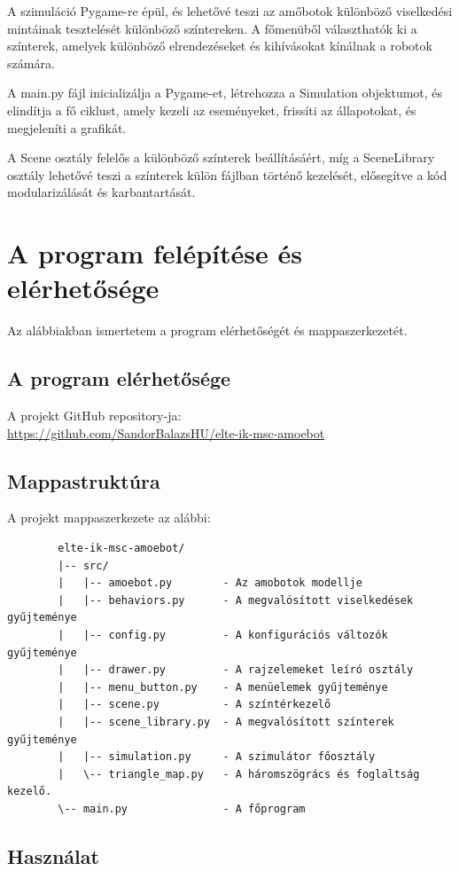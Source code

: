 \documentclass[	
  noindent
]{elteikthesis}[2024/04/26]
\begin{document}
A szimuláció Pygame-re épül, és lehetővé teszi az amőbotok különböző viselkedési mintáinak tesztelését különböző színtereken. A főmenüből választhatók ki a színterek, amelyek különböző elrendezéseket és kihívásokat kínálnak a robotok számára.

A main.py fájl inicializálja a Pygame-et, létrehozza a Simulation objektumot, és elindítja a fő ciklust, amely kezeli az eseményeket, frissíti az állapotokat, és megjeleníti a grafikát.

A Scene osztály felelős a különböző színterek beállításáért, míg a SceneLibrary osztály lehetővé teszi a színterek külön fájlban történő kezelését, elősegítve a kód modularizálását és karbantartását.

  \section{A program felépítése és elérhetősége}
    Az alábbiakban ismertetem a program elérhetőségét és mappaszerkezetét.

    \subsection{A program elérhetősége}
      A projekt GitHub repository-ja:
      \\
      \url{https://github.com/SandorBalazsHU/elte-ik-msc-amoebot}

    \subsection*{Mappastruktúra}
      A projekt mappaszerkezete az alábbi:
      \begin{verbatim}
        elte-ik-msc-amoebot/
        |-- src/
        |   |-- amoebot.py        - Az amobotok modellje
        |   |-- behaviors.py      - A megvalósított viselkedések gyűjteménye
        |   |-- config.py         - A konfigurációs változók gyűjteménye
        |   |-- drawer.py         - A rajzelemeket leíró osztály
        |   |-- menu_button.py    - A menüelemek gyűjteménye
        |   |-- scene.py          - A színtérkezelő
        |   |-- scene_library.py  - A megvalósított színterek gyűjteménye
        |   |-- simulation.py     - A szimulátor főosztály
        |   \-- triangle_map.py   - A háromszögrács és foglaltság kezelő.
        \-- main.py               - A főprogram
        \end{verbatim}

    \subsection{Használat}
\end{document}
